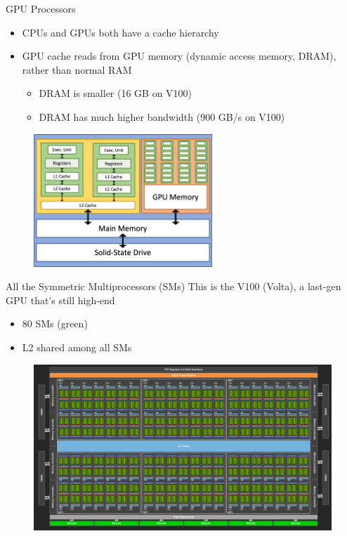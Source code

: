 \documentclass{beamer}
\begin{document}
    \begin{frame}{GPU Processors}
        \begin{itemize}
            \item CPUs and GPUs both have a cache hierarchy
            \item GPU cache reads from GPU memory (dynamic access memory, DRAM), rather than normal RAM
            \begin{itemize}
                \item DRAM is smaller (16 GB on V100)
                \item DRAM has much higher bandwidth (900 GB/s on V100)
            \end{itemize}
        \end{itemize}
        \begin{figure}
            \centering
            \includegraphics[width=0.6\textwidth]{img/01/mem_hier_node_gpu.png}
        \end{figure}
    \end{frame}

    \begin{frame}{All the Symmetric Multiprocessors (SMs)}
        This is the V100 (Volta), a last-gen GPU that's still high-end
        \begin{itemize}
            \item 80 SMs (green)
            \item L2 shared among all SMs
        \end{itemize}

        \begin{figure}
            \centering
            \includegraphics[width=\textwidth]{img/03/volta-smps.png}
        \end{figure}
    \end{frame}
\end{document}
